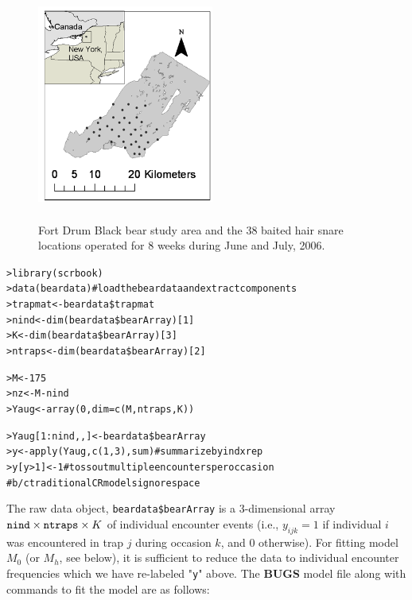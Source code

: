 \begin{figure}[ht]
\centering
\includegraphics[height=3in,width=2.28in]{Ch4-Closed/figs/hairsnares.png}
\caption{Fort Drum Black bear study area and the 38 baited hair snare
  locations operated for 8 weeks during June and July, 2006.}
\label{closed.fig.fortdrum}
\end{figure}

{\small
\begin{alltt}
> library(scrbook)
> data(beardata)              # load the bear data and extract components
> trapmat <- beardata\$trapmat
> nind <- dim(beardata\$bearArray)[1]
> K <- dim(beardata\$bearArray)[3]
> ntraps <- dim(beardata\$bearArray)[2]

> M <- 175
> nz <- M-nind
> Yaug <- array(0, dim=c(M,ntraps,K))

> Yaug[1:nind,,] <- beardata\$bearArray 
> y <- apply(Yaug,c(1,3),sum) # summarize by ind x rep
> y[y>1] <- 1                 # toss out multiple encounters per occasion
                              #    b/c traditional CR models ignore space
\end{alltt}
}


The raw data object, \mbox{\tt beardata\$bearArray} is a 3-dimensional
array $\mbox{\tt nind} \times \mbox{\tt ntraps} \times K$ of
individual encounter events (i.e., $y_{ijk} = 1$ if individual $i$ was
encountered in trap $j$ during occasion $k$, and 0 otherwise).  For
fitting model $M_{0}$ (or $M_{h}$, see below), it is sufficient to
reduce the data to individual encounter frequencies which we have
re-labeled "\mbox{\tt y}" above.  The {\bf BUGS} model file along with
commands to fit the model are as follows:

